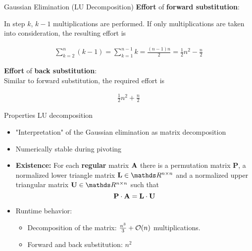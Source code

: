 \documentclass[11pt,compress,t,notes=noshow, xcolor=table]{beamer}
\begin{document}
\begin{vbframe}{Gaussian Elimination (LU Decomposition)}
\textbf{Effort} of \textbf{forward substitution}:\\

\medskip

In step $k$,  $k - 1$ multiplications are performed. If only multiplications are taken into consideration, the resulting effort is

\begin{eqnarray*}
\sum_{k=2}^{n} (k - 1) = \sum_{k=1}^{n - 1} k = \frac{(n- 1)n}{2} = \frac{1}{2}n^2 - \frac{n}{2}
\end{eqnarray*}

\lz

\textbf{Effort} of \textbf{back substitution}:\\
\medskip
Similar to forward substitution, the required effort is

\begin{eqnarray*}
\frac{1}{2}n^2 + \frac{n}{2}
\end{eqnarray*}

\framebreak


\end{vbframe}

\begin{vbframe} {Properties LU decomposition}

\begin{itemize}
\item "Interpretation" of the Gaussian elimination as matrix decomposition
\item Numerically stable during pivoting
\item \textbf{Existence:} For each \textbf{regular} matrix $\mathbf{A}$ there is a permutation matrix $\mathbf{P}$, a normalized lower triangle matrix $\mathbf{L} \in \R^{n \times n}$ and a normalized upper triangular matrix $\mathbf{U} \in \R^{n \times n}$ such that 
$$
\mathbf{P} \cdot \mathbf{A} = \mathbf{L} \cdot \mathbf{U}
$$
\item Runtime behavior:
\begin{itemize}
\item Decomposition of the matrix: $\frac{n^3}{3} + \mathcal{O}(n)$ multiplications. 
\item Forward and back substitution: $n^2$
\end{itemize}
\end{itemize}





\end{vbframe}


\endlecture
\end{document}
